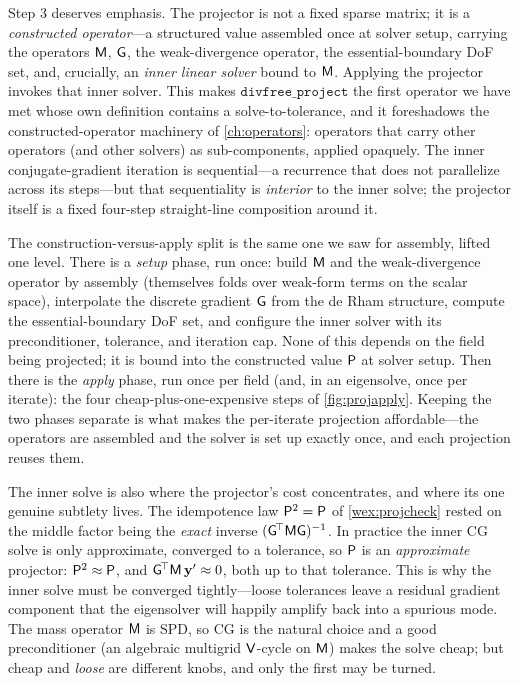 Step 3 deserves emphasis. The projector is not a fixed sparse matrix; it is a
\emph{constructed operator}---a structured value assembled once at solver setup,
carrying the operators $\mathsf{M}$, $\mathsf{G}$, the weak-divergence operator, the
essential-boundary DoF set, and, crucially, an \emph{inner linear solver} bound to
$\mathsf{M}$. Applying the projector invokes that inner solver. This makes
$\mathtt{divfree\_project}$ the first operator we have met whose own definition
contains a solve-to-tolerance, and it foreshadows the constructed-operator
machinery of \cref{ch:operators}: operators that carry other operators (and other
solvers) as sub-components, applied opaquely. The inner conjugate-gradient
iteration is sequential---a recurrence that does not parallelize across its
steps---but that sequentiality is \emph{interior} to the inner solve; the
projector itself is a fixed four-step straight-line composition around it.

The construction-versus-apply split is the same one we saw for assembly, lifted one
level. There is a \emph{setup} phase, run once: build $\mathsf{M}$ and the
weak-divergence operator by assembly (themselves folds over weak-form terms on the
scalar space), interpolate the discrete gradient $\mathsf{G}$ from the de Rham
structure, compute the essential-boundary DoF set, and configure the inner solver
with its preconditioner, tolerance, and iteration cap. None of this depends on the
field being projected; it is bound into the constructed value $\mathsf{P}$ at solver
setup. Then there is the \emph{apply} phase, run once per field (and, in an
eigensolve, once per iterate): the four cheap-plus-one-expensive steps of
\cref{fig:projapply}. Keeping the two phases separate is what makes the per-iterate
projection affordable---the operators are assembled and the solver is set up exactly
once, and each projection reuses them.

The inner solve is also where the projector's cost concentrates, and where its one
genuine subtlety lives. The idempotence law $\mathsf{P}^2=\mathsf{P}$ of
\cref{wex:projcheck} rested on the middle factor being the \emph{exact} inverse
$(\mathsf{G}^{\!\top}\mathsf{M}\mathsf{G})^{-1}$. In practice the inner CG solve is only
approximate, converged to a tolerance, so $\mathsf{P}$ is an \emph{approximate}
projector: $\mathsf{P}^2\approx\mathsf{P}$, and $\mathsf{G}^{\!\top}\mathsf{M}\,\mathbf{y}'\approx 0$,
both up to that tolerance. This is why the inner solve must be converged
tightly---loose tolerances leave a residual gradient component that the eigensolver
will happily amplify back into a spurious mode. The mass operator $\mathsf{M}$ is SPD,
so CG is the natural choice and a good preconditioner (an algebraic multigrid
$\mathsf{V}$-cycle on $\mathsf{M}$) makes the solve cheap; but cheap and \emph{loose} are
different knobs, and only the first may be turned.

